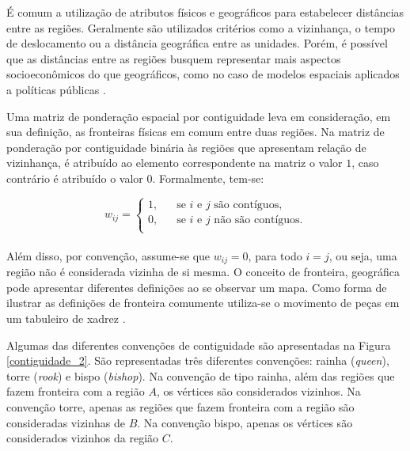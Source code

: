 \documentclass[12pt,a4paper]{article}
\begin{document}
É comum a utilização de atributos físicos e geográficos para estabelecer distâncias entre as regiões. Geralmente são utilizados critérios como a vizinhança, o tempo de deslocamento  ou a distância geográfica entre as unidades. Porém, é possível que as distâncias entre as regiões busquem representar mais aspectos socioeconômicos do que geográficos, como no caso de modelos espaciais aplicados a políticas públicas \cite{tyszler06_2}. 

Uma matriz de ponderação espacial por contiguidade leva em consideração, em sua definição, as fronteiras físicas em comum entre duas regiões. Na matriz de ponderação por contiguidade binária às regiões que apresentam relação de vizinhança, é atribuído ao elemento correspondente na matriz o valor $1$, caso contrário é atribuído o valor $0$. Formalmente, tem-se:
	
\[
w_{ij} = 
	\begin{cases}
    	\text{1,} & \quad\text{se $i$ e $j$ são contíguos}, \\
	    \text{0,} & \quad\text{se $i$ e $j$ não são contíguos.}\\
	\end{cases}
\]
\\
	
Além disso, por convenção, assume-se que  $w_{ij} =  0$, para todo $i = j$, ou seja, uma região não é considerada vizinha de si mesma. O conceito de fronteira, geográfica pode apresentar diferentes definições ao se observar um mapa. Como forma de ilustrar as definições de fronteira comumente utiliza-se o movimento de peças em um tabuleiro de xadrez \cite{almeida12_2}. 


Algumas das diferentes convenções de contiguidade são apresentadas na Figura \ref{contiguidade_2}. São representadas três diferentes convenções: rainha (\textit{queen}), torre (\textit{rook}) e bispo (\textit{bishop}). Na convenção de tipo rainha, além das regiões que fazem fronteira com a região $A$, os vértices são considerados vizinhos. Na convenção torre, apenas as regiões que fazem fronteira com a região são consideradas vizinhas de $B$. Na convenção bispo, apenas os vértices são considerados vizinhos da região $C$.
	
\end{document}
